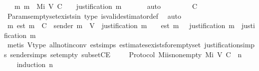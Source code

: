 \begin{isabellebody}
\ \ {\isachardoublequoteopen}{\isasymexists}\ m{\isachardot}\ m\ {\isasymin}\ Mi\ {\isacharparenleft}V{\isacharcomma}\ C{\isacharcomma}\ {\isasymepsilon}{\isacharparenright}\ {}\ {\isasymand}\ justification\ m\ {\isacharequal}\ {\isasymemptyset}{\isachardoublequoteclose}\ \isanewline
%
\isadelimproof
\ \ %
\endisadelimproof
%
\isatagproof
{}\isamarkupfalse%
\ auto\isanewline
{}\isamarkupfalse%
\ {\isacharminus}\isanewline
\ \ \isamarkupfalse%
\ {\isachardoublequoteopen}{\isasymepsilon}\ {\isasymemptyset}\ {\isasymsubseteq}\ C{\isachardoublequoteclose}\isanewline
\ \ \ \ \isamarkupfalse%
\ Params{\isachardot}empty{\isacharunderscore}set{\isacharunderscore}exists{\isacharunderscore}in{\isacharunderscore}{\isasymSigma}\ {\isasymepsilon}{\isacharunderscore}type\ is{\isacharunderscore}valid{\isacharunderscore}estimator{\isacharunderscore}def\ \isamarkupfalse%
\ auto\isanewline
\ \ \isamarkupfalse%
\ \isamarkupfalse%
\ {\isachardoublequoteopen}{\isasymexists}m{\isachardot}\ est\ m\ {\isasymin}\ C\ {\isasymand}\ sender\ m\ {\isasymin}\ V\ {\isasymand}\ justification\ m\ {\isacharequal}\ {\isasymemptyset}\ {\isasymand}\ est\ m\ {\isasymin}\ {\isasymepsilon}\ {\isacharparenleft}justification\ m{\isacharparenright}\ {\isasymand}\ justification\ m\ {\isacharequal}\ {\isasymemptyset}{\isachardoublequoteclose}\isanewline
\ \ \ \ \isamarkupfalse%
\ {\isacharparenleft}metis\ V{\isacharunderscore}type\ all{\isacharunderscore}not{\isacharunderscore}in{\isacharunderscore}conv\ est{\isachardot}simps\ estimates{\isacharunderscore}exists{\isacharunderscore}for{\isacharunderscore}empty{\isacharunderscore}set\ justification{\isachardot}simps\ sender{\isachardot}simps\ set{\isacharunderscore}empty\ subsetCE{\isacharparenright}\isanewline
{}\isamarkupfalse%
%
\endisatagproof
{\isafoldproof}%
%
\isadelimproof
\ \ \isanewline
%
\endisadelimproof
\isanewline
{}\isamarkupfalse%
\ {\isacharparenleft}\ Protocol{\isacharparenright}\ Mi{\isacharunderscore}is{\isacharunderscore}non{\isacharunderscore}empty{\isacharcolon}\ {\isachardoublequoteopen}Mi\ {\isacharparenleft}V{\isacharcomma}\ C{\isacharcomma}\ {\isasymepsilon}{\isacharparenright}\ n\ {\isasymnoteq}\ {\isasymemptyset}{\isachardoublequoteclose}\isanewline
%
\isadelimproof
\ \ %
\endisadelimproof
%
\isatagproof
{}\isamarkupfalse%
\ {\isacharparenleft}induction\ n{\isacharparenright}\isanewline
\ \ \isamarkupfalse%

\end{isabellebody}
